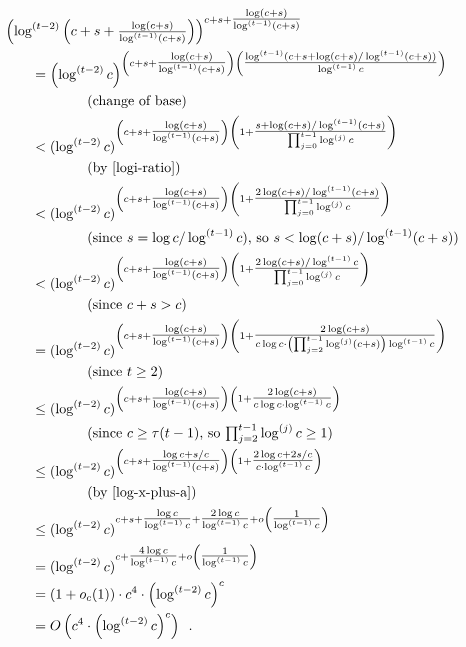 \documentclass[kpfonts]{patmorin}
\theoremstyle{named}
\begin{document}
\begin{align*}
    &\hspace{-2em} \left(\log^{(t-2)}\left(c+s+\tfrac{\log(c+s)}{\log^{(t-1)}(c+s)}\right)\right)^{c+s+\tfrac{\log(c+s)}{\log^{(t-1)}(c+s)}} \\
    & = \left(\log^{(t-2)}c\right)^{\left(c+s+\tfrac{\log(c+s)}{\log^{(t-1)}(c+s)}\right)
        \left(\tfrac{\log^{(t-1)}(c+s+\log(c+s)/\log^{(t-1)}(c+s))}{\log^{(t-1)}c}\right)} \\
        & \qquad\qquad\text{(change of base)} \\
    & < (\log^{(t-2)}c)^{\left(c+s+\tfrac{\log(c+s)}{\log^{(t-1)}(c+s)}\right)
        \left(1 + \tfrac{s+\log(c+s)/\log^{(t-1)}(c+s)}{\prod_{j=0}^{t-1}\log^{(j)}c}\right)} \\
        & \qquad\qquad\text{(by \cref{logi-ratio})}\\
    & < (\log^{(t-2)}c)^{\left(c+s+\tfrac{\log(c+s)}{\log^{(t-1)}(c+s)}\right)
        \left(1 + \tfrac{2\log(c+s)/\log^{(t-1)}(c+s)}{\prod_{j=0}^{t-1}\log^{(j)}c}\right)} \\
        & \qquad\qquad\text{(since $s=\log c/\log^{(t-1)} c$), so $s<\log(c+s)/\log^{(t-1)}(c+s)$)}\\
    & < (\log^{(t-2)}c)^{\left(c+s+\tfrac{\log(c+s)}{\log^{(t-1)}(c+s)}\right)
        \left(1 + \tfrac{2\log(c+s)/\log^{(t-1)}c}{\prod_{j=0}^{t-1}\log^{(j)}c}\right)} \\
        & \qquad\qquad\text{(since $c+s>c$)}\\
    & = (\log^{(t-2)}c)^{\left(c+s+\tfrac{\log(c+s)}{\log^{(t-1)}(c+s)}\right)
        \left(1 + \tfrac{2\log(c+s)}{c\log c\cdot\left(\prod_{j=2}^{t-1}\log^{(j)}(c+s)\right)\log^{(t-1)}c}\right)} \\
        & \qquad\qquad\text{(since $t\ge 2$)}\\
    & \le (\log^{(t-2)}c)^{\left(c+s+\tfrac{\log(c+s)}{\log^{(t-1)}(c+s)}\right)
        \left(1 + \tfrac{2\log(c+s)}{c\log c\cdot\log^{(t-1)}c}\right)} \\            & \qquad\qquad\text{(since $c\ge \tau(t-1)$, so $\textstyle \prod_{j=2}^{t-1}\log^{(j)}c\ge 1$)} \\
    & \le (\log^{(t-2)}c)^{\left(c+s+\tfrac{\log c+s/c}{\log^{(t-1)}(c+s)}\right)
        \left(1 + \tfrac{2\log c+2s/c}{c\cdot\log^{(t-1)}c}\right)} \\            & \qquad\qquad\text{(by \cref{log-x-plus-a})} \\
    & \le (\log^{(t-2)}c)^{c+s+\tfrac{\log c}{\log^{(t-1)}c} +
        \tfrac{2\log c}{\log^{(t-1)}c} + o\left(\tfrac{1}{\log^{(t-1)} c}\right)}  \\
    & = (\log^{(t-2)}c)^{c+\tfrac{4\log c}{\log^{(t-1)}c} + o\left(\tfrac{1}{\log^{(t-1)} c}\right)}  \\
    & = (1+o_c(1))\cdot c^4\cdot \left(\log^{(t-2)}c\right)^{c} \\
    & = O\left(c^4\cdot\left(\log^{(t-2)}c\right)^{c}\right) \enspace .
\end{align*}
\end{document}
